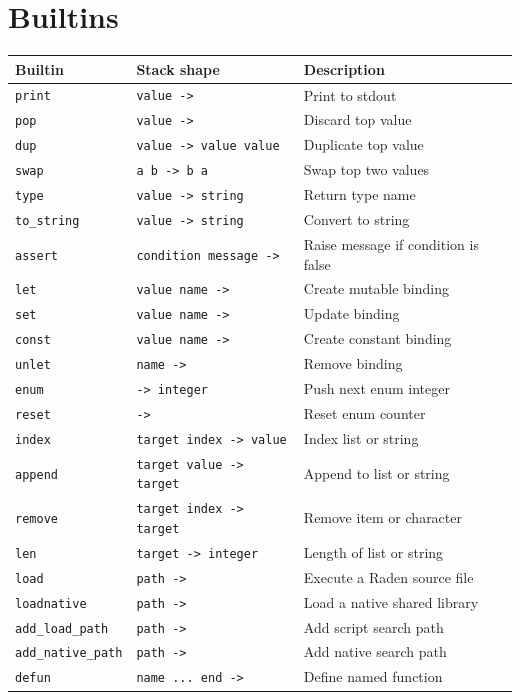 \documentclass[11pt,a4paper]{article}
\newcommand{\code}[1]{\texttt{#1}}
\begin{document}
\section{Builtins}

\begin{longtable}{lll}
\toprule
Builtin & Stack shape & Description \\
\midrule
\code{print} & \code{value ->} & Print to stdout \\
\code{pop} & \code{value ->} & Discard top value \\
\code{dup} & \code{value -> value value} & Duplicate top value \\
\code{swap} & \code{a b -> b a} & Swap top two values \\
\code{type} & \code{value -> string} & Return type name \\
\code{to\_string} & \code{value -> string} & Convert to string \\
\code{assert} & \code{condition message ->} & Raise message if condition is false \\
\code{let} & \code{value name ->} & Create mutable binding \\
\code{set} & \code{value name ->} & Update binding \\
\code{const} & \code{value name ->} & Create constant binding \\
\code{unlet} & \code{name ->} & Remove binding \\
\code{enum} & \code{-> integer} & Push next enum integer \\
\code{reset} & \code{->} & Reset enum counter \\
\code{index} & \code{target index -> value} & Index list or string \\
\code{append} & \code{target value -> target} & Append to list or string \\
\code{remove} & \code{target index -> target} & Remove item or character \\
\code{len} & \code{target -> integer} & Length of list or string \\
\code{load} & \code{path ->} & Execute a Raden source file \\
\code{loadnative} & \code{path ->} & Load a native shared library \\
\code{add\_load\_path} & \code{path ->} & Add script search path \\
\code{add\_native\_path} & \code{path ->} & Add native search path \\
\code{defun} & \code{name ... end ->} & Define named function \\

\end{longtable}
\end{document}
